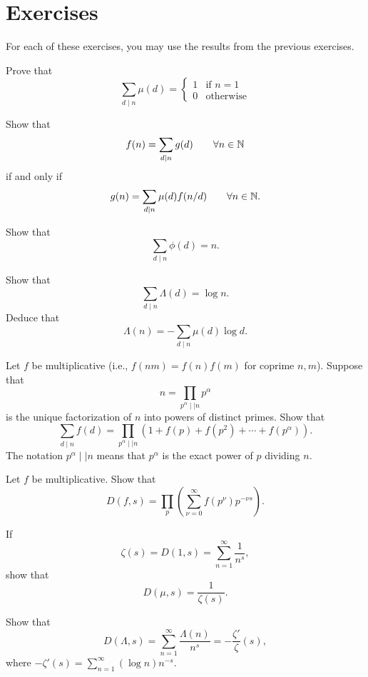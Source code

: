 \documentclass{article}
\begin{document}
\section{Exercises}

For each of these exercises, you may use the results from the previous exercises.

\begin{exercise}
    Prove that
    \[\sum_{d\mid n}\mu(d)=\begin{cases}
        1 & \textrm{if }n=1\\
        0 & \textrm{otherwise}
    \end{cases}\]
\end{exercise}

\begin{exercise}
    Show that
    \[f(n) = \sum_{d\mid n}g(d)\qquad \forall n\in\mathbb{N}\]
    if and only if
    \[g(n) = \sum_{d\mid n}\mu(d)f(n/d)\qquad \forall n\in\mathbb{N}.\]
\end{exercise}

\begin{exercise}
    Show that
    \[\sum_{d\mid n}\phi(d) = n.\]
\end{exercise}

\begin{exercise}
    Show that 
    \[\sum_{d\mid n}\Lambda(d) = \log n.\]
    Deduce that
    \[\Lambda(n) = -\sum_{d\mid n}\mu(d)\log d.\]
\end{exercise}

\begin{exercise}
    Let \(f\) be multiplicative (i.e., \(f(nm)=f(n)f(m)\) for coprime \(n,m\)). 
    Suppose that
    \[n = \prod_{p^\alpha\mid\mid n}p^\alpha\]
    is the unique factorization of \(n\) into powers of distinct primes.
    Show that
    \[\sum_{d\mid n}f(d) = \prod_{p^{\alpha}\mid\mid n}\left(1 + f(p) + f(p^2) + \cdots + f(p^\alpha)\right).\]
    The notation \(p^\alpha\mid\mid n\) means that \(p^{\alpha}\) is the exact power of \(p\) dividing \(n.\)
\end{exercise}

\begin{exercise}
    Let \(f\) be multiplicative. 
    Show that
    \[D(f,s) = \prod_p\left(\sum_{\nu=0}^\infty f(p^\nu)p^{-\nu s}\right).\]
\end{exercise}

\begin{exercise}
    If 
    \[\zeta(s) = D(1,s) = \sum_{n=1}^\infty\frac{1}{n^s},\]
    show that 
    \[D(\mu,s)=\frac{1}{\zeta(s)}.\]
\end{exercise}

\begin{exercise}
    Show that
    \[D(\Lambda,s) = \sum_{n=1}^\infty\frac{\Lambda(n)}{n^s} = -\frac{\zeta'}{\zeta}(s),\]
    where \(-\zeta'(s) = \sum_{n=1}^\infty(\log n)n^{-s}\).
\end{exercise}
\end{document}
